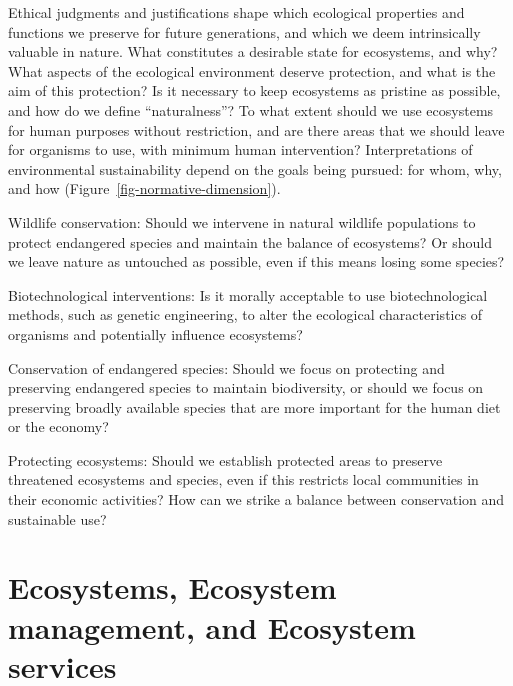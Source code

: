 \documentclass[
  a4paper,
  openany]{book}
\begin{document}
Ethical judgments and justifications shape which ecological properties
and functions we preserve for future generations, and which we deem
intrinsically valuable in nature. What constitutes a desirable state for
ecosystems, and why? What aspects of the ecological environment deserve
protection, and what is the aim of this protection? Is it necessary to
keep ecosystems as pristine as possible, and how do we define
``naturalness''? To what extent should we use ecosystems for human
purposes without restriction, and are there areas that we should leave
for organisms to use, with minimum human intervention? Interpretations
of environmental sustainability depend on the goals being pursued: for
whom, why, and how (Figure~\ref{fig-normative-dimension}).

\begin{tcolorbox}[enhanced jigsaw, coltitle=black, bottomtitle=1mm, opacitybacktitle=0.6, titlerule=0mm, opacityback=0, leftrule=.75mm, colbacktitle=quarto-callout-tip-color!10!white, bottomrule=.15mm, toptitle=1mm, breakable, title={Specific examples of ethical assessments in the context of environmental
sustainability}, arc=.35mm, rightrule=.15mm, toprule=.15mm, left=2mm, colback=white, colframe=quarto-callout-tip-color-frame]

Wildlife conservation: Should we intervene in natural wildlife
populations to protect endangered species and maintain the balance of
ecosystems? Or should we leave nature as untouched as possible, even if
this means losing some species?

Biotechnological interventions: Is it morally acceptable to use
biotechnological methods, such as genetic engineering, to alter the
ecological characteristics of organisms and potentially influence
ecosystems?

Conservation of endangered species: Should we focus on protecting and
preserving endangered species to maintain biodiversity, or should we
focus on preserving broadly available species that are more important
for the human diet or the economy?

Protecting ecosystems: Should we establish protected areas to preserve
threatened ecosystems and species, even if this restricts local
communities in their economic activities? How can we strike a balance
between conservation and sustainable use?

\end{tcolorbox}

\section{Ecosystems, Ecosystem management, and Ecosystem
services}\label{ecosystems-ecosystem-management-and-ecosystem-services}
\end{document}
